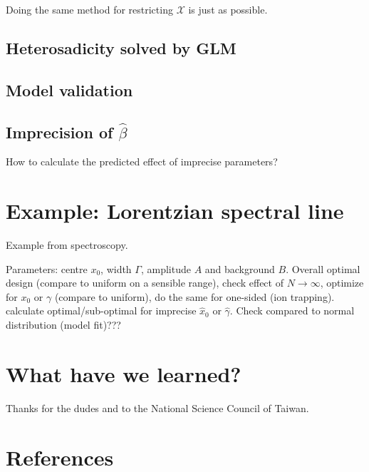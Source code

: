 \documentclass[12pt]{iopart}
\begin{document}
Doing the same method for restricting $\mathcal{X}$ is just as possible. 

\subsection{Heterosadicity solved by GLM}
\subsection{Model validation}

\subsection{Imprecision of $\hat \beta$}

How to calculate the predicted effect of imprecise parameters?

\section{Example: Lorentzian spectral line}

Example from spectroscopy.

Parameters: centre $x_0$, width $\Gamma$, amplitude $A$ and background $B$. Overall optimal design (compare to uniform on a sensible range), check effect of $N \rightarrow \infty$, optimize for $x_0$ or $\gamma$ (compare to uniform), do the same for one-sided (ion trapping). calculate optimal/sub-optimal for imprecise $\hat x_0$ or $\hat\gamma$. Check compared to normal distribution (model fit)???

\section{What have we learned?}

\ack Thanks for the dudes and to the National Science Council of Taiwan.

\section*{References}


\end{document}
